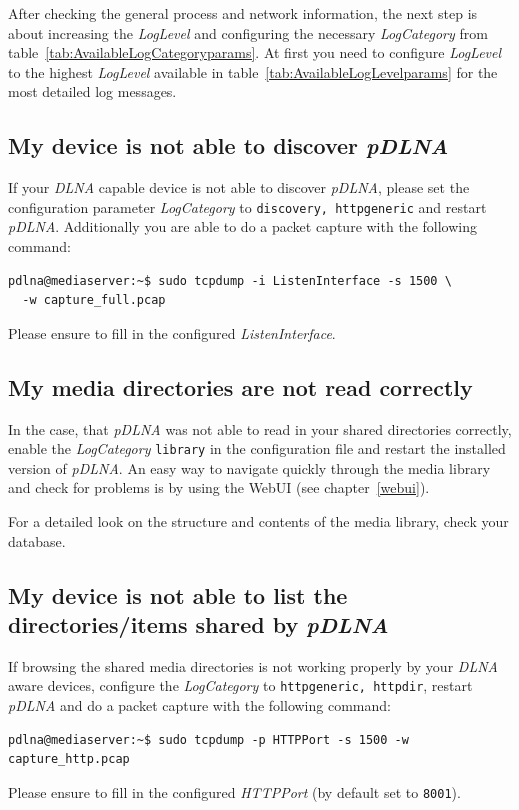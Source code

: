 \documentclass[a4paper,oneside,10pt]{report}
\begin{document}
After checking the general process and network information, the next step is about increasing the {\em LogLevel} and configuring the necessary {\em LogCategory} from table~\ref{tab:AvailableLogCategoryparams}. At first you need to configure {\em LogLevel} to the highest {\em LogLevel} available in table~\ref{tab:AvailableLogLevelparams} for the most detailed log messages.

\subsection{My device is not able to discover {\em pDLNA}}

If your {\em DLNA} capable device is not able to discover {\em pDLNA}, please set the configuration parameter {\em LogCategory} to \verb|discovery, httpgeneric| and restart {\em pDLNA}. Additionally you are able to do a packet capture with the following command:
\begin{lstlisting}
pdlna@mediaserver:~$ sudo tcpdump -i ListenInterface -s 1500 \
  -w capture_full.pcap
\end{lstlisting}
Please ensure to fill in the configured {\em ListenInterface}.

\subsection{My media directories are not read correctly}

In the case, that {\em pDLNA} was not able to read in your shared directories correctly, enable the {\em LogCategory} \verb|library| in the configuration file and restart the installed version of {\em pDLNA}. An easy way to navigate quickly through the media library and check for problems is by using the WebUI (see chapter~\ref{webui}).

For a detailed look on the structure and contents of the media library, check your database.

\subsection{My device is not able to list the directories/items shared by {\em pDLNA}}

If browsing the shared media directories is not working properly by your {\em DLNA} aware devices, configure the {\em LogCategory} to \verb|httpgeneric, httpdir|, restart {\em pDLNA} and do a packet capture with the following command:
\begin{lstlisting}
pdlna@mediaserver:~$ sudo tcpdump -p HTTPPort -s 1500 -w capture_http.pcap
\end{lstlisting}
Please ensure to fill in the configured {\em HTTPPort} (by default set to \verb|8001|).
\end{document}
